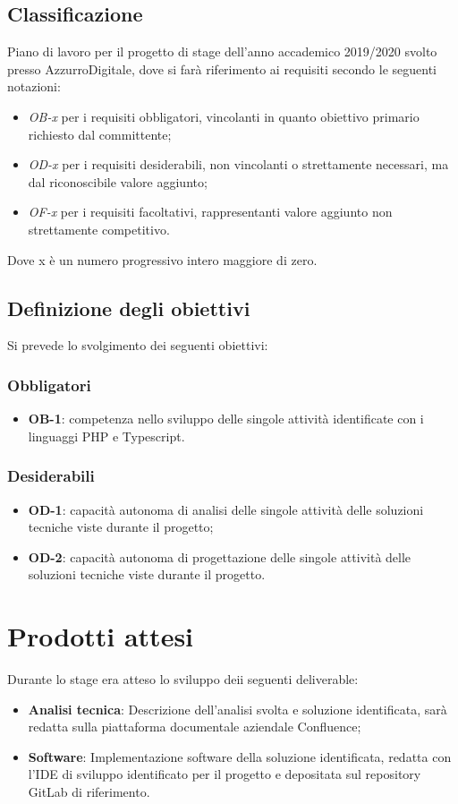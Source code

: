 \subsection{Classificazione}
Piano di lavoro per il progetto di stage dell'anno accademico 2019/2020 svolto presso AzzurroDigitale, dove si farà riferimento ai requisiti secondo le seguenti notazioni:
\begin{itemize}
	\item \textit{OB-x} per i requisiti obbligatori, vincolanti in quanto obiettivo primario richiesto dal committente;
	\item \textit{OD-x} per i requisiti desiderabili, non vincolanti o strettamente necessari,
	ma dal riconoscibile valore aggiunto;
	\item \textit{OF-x} per i requisiti facoltativi, rappresentanti valore aggiunto non strettamente competitivo.
\end{itemize}
Dove x è un numero progressivo intero maggiore di zero.

\subsection{Definizione degli obiettivi}
Si prevede lo svolgimento dei seguenti obiettivi:
\subsubsection*{Obbligatori}
\begin{itemize}
 \item \textbf{OB-1}: competenza nello sviluppo delle singole attività identificate con i linguaggi PHP e Typescript.
\end{itemize}
\subsubsection*{Desiderabili} 
\begin{itemize}
 \item \textbf{OD-1}: capacità autonoma di analisi delle singole attività delle soluzioni tecniche viste durante il progetto;
\item \textbf{OD-2}: capacità autonoma di progettazione delle singole attività delle soluzioni tecniche viste durante il progetto.
\end{itemize}

\section{Prodotti attesi}
Durante lo stage era atteso lo sviluppo deii seguenti deliverable:
\begin{itemize}
	\item \textbf{Analisi tecnica}: Descrizione dell’analisi svolta e soluzione identificata, sarà redatta sulla piattaforma documentale aziendale Confluence;
	\item \textbf{Software}: Implementazione software della soluzione identificata, redatta con l’IDE di sviluppo identificato per il progetto e depositata sul repository GitLab di riferimento.
\end{itemize}

